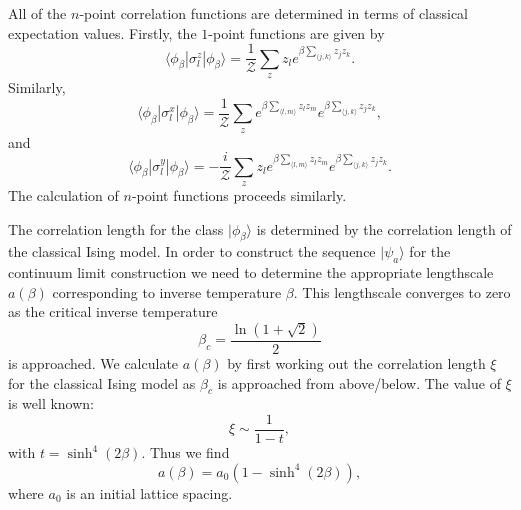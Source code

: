 \documentclass[prl,twocolumn,lengthcheck,superscriptaddress]{revtex4-1}
\theoremstyle{definition}
\theoremstyle{remark}
\begin{document}
All of the $n$-point correlation functions are determined in terms of classical expectation values. Firstly, the $1$-point functions are given by
\begin{equation}
	\langle \phi_\beta|\sigma^z_l|\phi_\beta\rangle = \frac{1}{\mathcal{Z}}\sum_{z} z_le^{\beta \sum_{\langle j, k\rangle} z_jz_k}.
\end{equation}
Similarly,
\begin{equation}
	\langle \phi_\beta|\sigma^x_l|\phi_\beta\rangle = \frac{1}{\mathcal{Z}}\sum_{z}  e^{\beta\sum_{\langle l,m\rangle} z_lz_m} e^{\beta \sum_{\langle j, k\rangle} z_jz_k},
\end{equation}
and
\begin{equation}
	\langle \phi_\beta|\sigma^y_l|\phi_\beta\rangle = -\frac{i}{\mathcal{Z}}\sum_{z} z_l e^{\beta\sum_{\langle l,m\rangle} z_lz_m} e^{\beta \sum_{\langle j, k\rangle} z_jz_k}.
\end{equation}
The calculation of $n$-point functions proceeds similarly.

The correlation length for the class $|\phi_\beta\rangle$ is determined by the correlation length of the classical Ising model. In order to construct the sequence $|\psi_a\rangle$ for the continuum limit construction we need to determine the appropriate lengthscale $a(\beta)$ corresponding to inverse temperature $\beta$. This lengthscale converges to zero as the critical inverse temperature 
\begin{equation}
	\beta_c = \frac{\ln(1+\sqrt{2})}{2}
\end{equation}
is approached. We calculate $a(\beta)$ by first working out the correlation length $\xi$ for the classical Ising model as $\beta_c$ is approached from above/below. The value of $\xi$ is well known:
\begin{equation}
	\xi \sim \frac{1}{1-t},
\end{equation}
with $t = \sinh^4(2\beta)$. Thus we find
\begin{equation}
	a(\beta) = a_0(1-\sinh^4(2\beta)),
\end{equation}
where $a_0$ is an initial lattice spacing.
\end{document}
